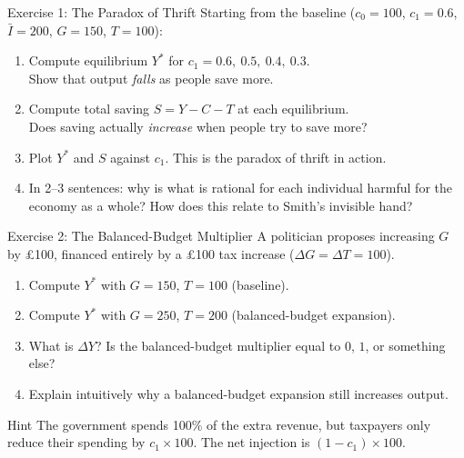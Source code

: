 \documentclass[aspectratio=169, 10pt]{beamer}
\begin{document}
\begin{frame}{Exercise 1: The Paradox of Thrift}
Starting from the baseline ($c_0 = 100$, $c_1 = 0.6$, $\bar{I} = 200$,
$G = 150$, $T = 100$):
\vspace{0.3em}
\begin{enumerate}
  \item Compute equilibrium $Y^*$ for $c_1 = 0.6,\ 0.5,\ 0.4,\ 0.3$.\\
        Show that output \textit{falls} as people save more.
  \item Compute total saving $S = Y - C - T$ at each equilibrium.\\
        Does saving actually \textit{increase} when people try to save more?
  \item Plot $Y^*$ and $S$ against $c_1$. This is the paradox of thrift in action.
  \item In 2--3 sentences: why is what is rational for each individual
        harmful for the economy as a whole?
        How does this relate to Smith's invisible hand?
\end{enumerate}
\end{frame}

\begin{frame}{Exercise 2: The Balanced-Budget Multiplier}
A politician proposes increasing $G$ by \pounds100, financed entirely
by a \pounds100 tax increase ($\Delta G = \Delta T = 100$).
\vspace{0.3em}
\begin{enumerate}
  \item Compute $Y^*$ with $G = 150$, $T = 100$ (baseline).
  \item Compute $Y^*$ with $G = 250$, $T = 200$ (balanced-budget expansion).
  \item What is $\Delta Y$? Is the balanced-budget multiplier
        equal to $0$, $1$, or something else?
  \item Explain intuitively why a balanced-budget expansion still
        increases output.
\end{enumerate}
\vspace{0.5em}
\begin{alertblock}{Hint}
The government spends 100\% of the extra revenue, but taxpayers
only reduce their spending by $c_1 \times 100$.
The net injection is $(1 - c_1) \times 100$.
\end{alertblock}
\end{frame}
\end{document}

